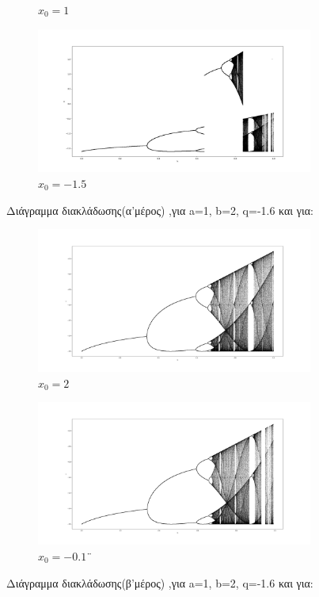 \begin{figure}[h!]
\begin{subfigure}[b]{0.7\textwidth}
		\caption{\(x_0=1\)}
		\label{f:g29}
	\end{subfigure}
	\hfill
	\begin{subfigure}[b]{0.7\textwidth}
		\centering
		\includegraphics[width=\textwidth]{LateX images/graphs q16/g4}
		\caption{\(x_0=-1.5\)}
		\label{f:g30}
	\end{subfigure}
	\hfill
	\caption{ Διάγραμμα διακλάδωσης(α'μέρος) ,για a=1, b=2, q=-1.6 και για:}
\end{figure}

\begin{figure}[h!]
	\centering
	\begin{subfigure}[b]{0.7\textwidth}
		\centering
		\includegraphics[width=\textwidth]{LateX images/graphs q16/g5}
		\caption{\(x_0=2\)}
		\label{f:g31}
	\end{subfigure}
	\hfill
	\begin{subfigure}[b]{0.7\textwidth}
		\centering
		\includegraphics[width=\textwidth]{LateX images/graphs q16/g6}
		\caption{\(x_0=-0.1\)¨}
		\label{f:g32}
	\end{subfigure}
	\hfill
	\caption{ Διάγραμμα διακλάδωσης(β'μέρος) ,για a=1, b=2, q=-1.6 και για:}
	\label{f:g234}
\end{figure}
	
